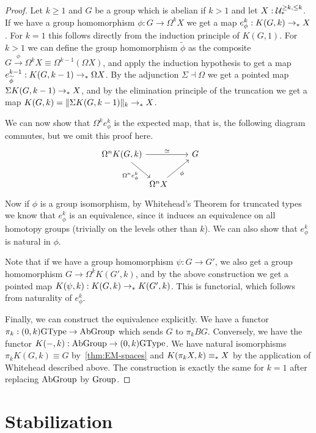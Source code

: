 \begin{proof}
  Let $k\ge1$ and $G$ be a group which is abelian if $k>1$ and let $X:\UU_\pt^{\ge k,\le k}$. If we have a group homomorphism $\phi : G \to \Omega^k X$ we get a map $e_\phi^k:K(G,k)\to_\pt X$. For $k=1$ this follows directly from the induction principle of $K(G,1)$. For $k>1$ we can define the group homomorphism $\widetilde\phi$ as the composite $G \xrightarrow{\phi} \Omega^k X \equiv \Omega^{k-1}(\Omega X)$, and apply the induction hypothesis to get a map
  $e_{\widetilde\phi}^{k-1}:K(G,k-1)\to_\pt \Omega X$. By the adjunction $\Sigma\dashv\Omega$ we get a pointed map $\Sigma K(G,k-1)\to_\pt X$, and by the elimination principle of the truncation we get a map $K(G,k)=\trunc{k}{\Sigma K(G,k-1)}\to_\pt X$. 

  We can now show that $\Omega^k e_\phi^k$ is the expected map, that is, the following diagram commutes, but we omit this proof here.
\begin{equation*}
\begin{tikzcd}[column sep=0]
\Omega^nK(G,k) \arrow[rr,"\eqvsym"] \arrow[dr,swap,"\Omega^n e_\phi^k"] & & G \\
& \Omega^n X \arrow[ur,swap,"\phi"] & \phantom{\Omega^nK(G,k)}
\end{tikzcd}
\end{equation*}
  Now if $\phi$ is a group isomorphism, by Whitehead's Theorem for truncated types \cite[Theorem 8.8.3]{hottbook} we know that $e_\phi^k$ is an equivalence, since it induces an equivalence on all homotopy groups (trivially on the levels other than $k$). We can also show that $e_\phi^k$ is natural in $\phi$.

  Note that if we have a group homomorphism $\psi:G\to G'$, we also get a group homomorphism $G\to\Omega^k K(G',k)$, and by the above construction we get a pointed map $K(\psi,k):K(G,k)\to_\pt K(G',k)$. This is functorial, which follows from naturality of $e_\phi^k$. 

  Finally, we can construct the equivalence explicitly. We have a functor
  $\pi_k:(0,k)\GType \to \AbGroup$ which sends $G$ to $\pi_k BG$. Conversely, we have the functor $K({-},k):\AbGroup\to (0,k)\GType$. We have natural isomorphisms
  $\pi_k K(G,k)\equiv G$ by~\cref{thm:EM-spaces} and $K(\pi_k X,k)\equiv_\pt X$ by the application of Whitehead described above. The construction is exactly the same for $k=1$ after replacing $\AbGroup$ by $\Group$.
\end{proof}

\section{Stabilization}
\label{sec:stabilization}

